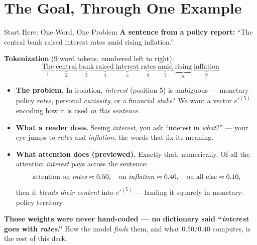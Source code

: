 \section{The Goal, Through One Example}

\begin{frame}{Start Here: One Word, One Problem}
\small
\textbf{A sentence from a policy report:} ``The central bank raised interest rates amid rising inflation.''

\smallskip
\textbf{Tokenization} (9 word tokens, numbered left to right):
\[
\underbrace{\text{The}}_{1}\;\underbrace{\text{central}}_{2}\;\underbrace{\text{bank}}_{3}\;\underbrace{\text{raised}}_{4}\;\underbrace{\text{interest}}_{5}\;\underbrace{\text{rates}}_{6}\;\underbrace{\text{amid}}_{7}\;\underbrace{\text{rising}}_{8}\;\underbrace{\text{inflation}}_{9}
\]

\begin{itemize}
\item \textbf{The problem.} In isolation, \emph{interest} (position 5) is ambiguous --- monetary-policy \emph{rates}, personal \emph{curiosity}, or a financial \emph{stake}? We want a vector $e'^{(5)}$ encoding how it is used \emph{in this sentence}.
\item \textbf{What a reader does.} Seeing \emph{interest}, you ask ``interest in \emph{what}?'' --- your eye jumps to \emph{rates} and \emph{inflation}, the words that fix its meaning.
\item \textbf{What attention does (previewed).} Exactly that, numerically. Of all the attention \emph{interest} pays across the sentence:
\[
   \text{attention on \emph{rates}} \approx 0.50, \quad
   \text{on \emph{inflation}} \approx 0.40, \quad
   \text{on all else} \approx 0.10,
\]
then it \emph{blends their content} into $e'^{(5)}$ --- landing it squarely in monetary-policy territory.
\end{itemize}

\smallskip
\begin{takeawaybox}
\textbf{Those weights were never hand-coded --- no dictionary said ``\emph{interest} goes with \emph{rates}.''} How the model \emph{finds} them, and what $0.50/0.40$ computes, is the rest of this deck.
\end{takeawaybox}
\end{frame}

